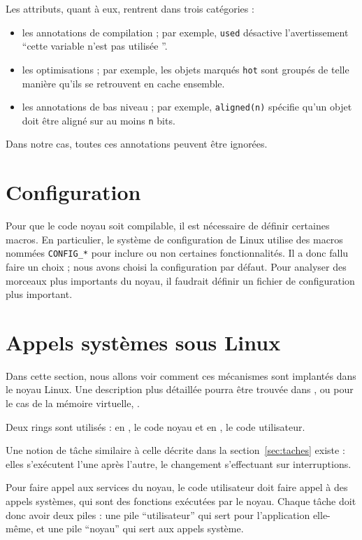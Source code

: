 Les attributs, quant à eux, rentrent dans trois catégories :

\begin{itemize}
  \item les annotations de compilation ; par exemple, \texttt{used} désactive
    l'avertissement ``cette variable n'est pas utilisée ''.

  \item les optimisations ; par exemple, les objets marqués \texttt{hot} sont
    groupés de telle manière qu'ils se retrouvent en cache ensemble.

  \item les annotations de bas niveau ; par exemple, \texttt{aligned(n)}
    spécifie qu'un objet doit être aligné sur au moins \texttt{n} bits.
\end{itemize}

Dans notre cas, toutes ces annotations peuvent être ignorées.

\section{Configuration}

Pour que le code noyau soit compilable, il est nécessaire de définir certaines
macros. En particulier, le système de configuration de Linux utilise des macros
nommées \texttt{CONFIG\_*} pour inclure ou non certaines fonctionnalités. Il a
donc fallu faire un choix ; nous avons choisi la configuration par défaut. Pour
analyser des morceaux plus importants du noyau, il faudrait définir un fichier
de configuration plus important.

\section{Appels systèmes sous Linux}

Dans cette section, nous allons voir comment ces mécanismes sont implantés dans
le noyau Linux. Une description plus détaillée pourra être trouvée dans
\cite{UnderstandingTheLinuxKernel}, ou pour le cas de la mémoire virtuelle,
\cite{LinuxVMM}.

Deux rings sont utilisés : en , le code noyau et en , le code
utilisateur.

Une notion de tâche similaire à celle décrite dans la section~\ref{sec:taches}
existe : elles s'exécutent l'une après l'autre, le changement s'effectuant sur
interruptions.

Pour faire appel aux services du noyau, le code utilisateur doit faire appel à
des appels systèmes, qui sont des fonctions exécutées par le noyau. Chaque tâche
doit donc avoir deux piles : une pile ``utilisateur'' qui sert pour
l'application elle-même, et une pile ``noyau'' qui sert aux appels système.

